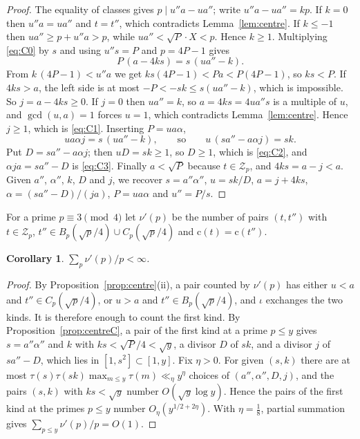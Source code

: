 \documentclass[aps,prd,twocolumn,superscriptaddress,nofootinbib,longbibliography,floatfix,showkeys,nobalancelastpage,amsmath,amssymb,10pt]{revtex4-2}
\theoremstyle{plain}
\newtheorem{corollary}[theorem]{Corollary}
\theoremstyle{definition}
\theoremstyle{plain}
\newcommand{\Zc}{\mathcal{Z}}
\newcommand{\cl}{\mathrm{c}}
\begin{document}
\begin{proof}
The equality of classes gives $p\mid u''a-ua''$; write $u''a-ua''=kp$. If $k=0$ then $u''a=ua''$ and $t=t''$, which contradicts Lemma~\ref{lem:centre}. If $k\le-1$ then $ua''\ge p+u''a>p$, while $ua''<\sqrt P\cdot X<p$. Hence $k\ge1$. Multiplying \eqref{eq:C0} by $s$ and using $u''s=P$ and $p=4P-1$ gives
\[
P\,(a-4ks)=s\,(ua''-k).
\]
From $k\,(4P-1)<u''a$ we get $ks(4P-1)<Pa<P(4P-1)$, so $ks<P$. If $4ks>a$, the left side is at most $-P<-sk\le s(ua''-k)$, which is impossible. So $j=a-4ks\ge0$. If $j=0$ then $ua''=k$, so $a=4ks=4ua''s$ is a multiple of $u$, and $\gcd(u,a)=1$ forces $u=1$, which contradicts Lemma~\ref{lem:centre}. Hence $j\ge1$, which is \eqref{eq:C1}. Inserting $P=ua\alpha$,
\[
ua\alpha j=s\,(ua''-k),\qquad\text{so}\qquad u\,(sa''-a\alpha j)=sk.
\]
Put $D=sa''-a\alpha j$; then $uD=sk\ge1$, so $D\ge1$, which is \eqref{eq:C2}, and $\alpha ja=sa''-D$ is \eqref{eq:C3}. Finally $a<\sqrt P$ because $t\in\Zc_p$, and $4ks=a-j<a$. Given $a''$, $\alpha''$, $k$, $D$ and $j$, we recover $s=a''\alpha''$, $u=sk/D$, $a=j+4ks$, $\alpha=(sa''-D)/(ja)$, $P=ua\alpha$ and $u''=P/s$.
\end{proof}

For a prime $p\equiv3\pmod4$ let $\nu'(p)$ be the number of pairs $(t,t'')$ with $t\in\Zc_p$, $t''\in B_p(\sqrt p/4)\cup C_p(\sqrt p/4)$ and $\cl(t)=\cl(t'')$.

\begin{corollary}\label{cor:nuprime}
$\sum_p\nu'(p)/p<\infty$.
\end{corollary}

\begin{proof}
By Proposition~\ref{prop:centre}(ii), a pair counted by $\nu'(p)$ has either $u<a$ and $t''\in C_p(\sqrt p/4)$, or $u>a$ and $t''\in B_p(\sqrt p/4)$, and $\iota$ exchanges the two kinds. It is therefore enough to count the first kind. By Proposition~\ref{prop:centreC}, a pair of the first kind at a prime $p\le y$ gives $s=a''\alpha''$ and $k$ with $ks<\sqrt P/4<\sqrt y$, a divisor $D$ of $sk$, and a divisor $j$ of $sa''-D$, which lies in $[1,s^2]\subset[1,y]$. Fix $\eta>0$. For given $(s,k)$ there are at most $\tau(s)\tau(sk)\max_{m\le y}\tau(m)\ll_\eta y^\eta$ choices of $(a'',\alpha'',D,j)$, and the pairs $(s,k)$ with $ks<\sqrt y$ number $O(\sqrt y\log y)$. Hence the pairs of the first kind at the primes $p\le y$ number $O_\eta(y^{1/2+2\eta})$. With $\eta=\frac18$, partial summation gives $\sum_{p\le y}\nu'(p)/p=O(1)$.
\end{proof}
\end{document}
